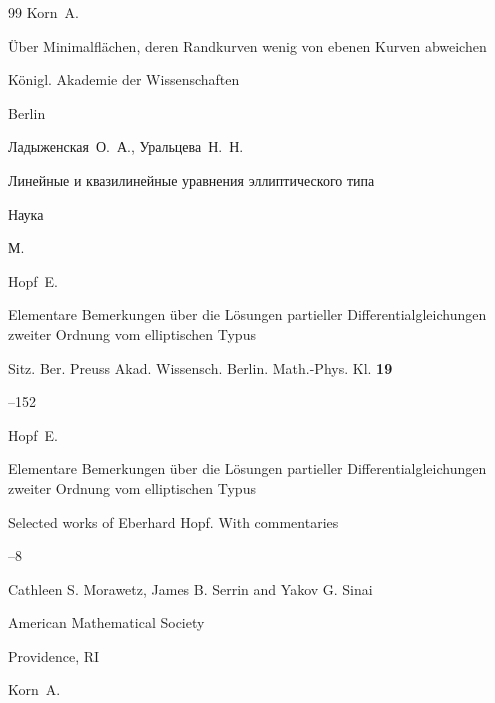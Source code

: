 \begin{thebibliography}{99}
\by Korn~A.

\book \"Uber Minimalfl\"achen, deren Randkurven wenig von ebenen Kurven abweichen


\publ K\"onigl. Akademie der Wissenschaften

\publaddr Berlin






\by Ладыженская~О.~А., Уральцева~Н.~Н.

\book Линейные и квазилинейные уравнения эллиптического типа


\publ Наука

\publaddr М.





\by Hopf~E.

\paper Elementare Bemerkungen \"uber die L\"osungen partieller Differentialgleichungen zweiter Ordnung vom elliptischen Typus

\jour Sitz. Ber. Preuss Akad. Wissensch. Berlin. Math.-Phys. Kl. {\bf 19}


--152


\moreref

\by Hopf~E.

\paper Elementare Bemerkungen \"uber die L\"osungen partieller Differentialgleichungen zweiter Ordnung vom elliptischen Typus

\inbook Selected works of Eberhard Hopf. With commentaries


--8

\eds Cathleen S. Morawetz, James B. Serrin and Yakov G. Sinai

\publ American Mathematical Society

\publaddr Providence, RI





\by Korn~A.


\end{thebibliography}
